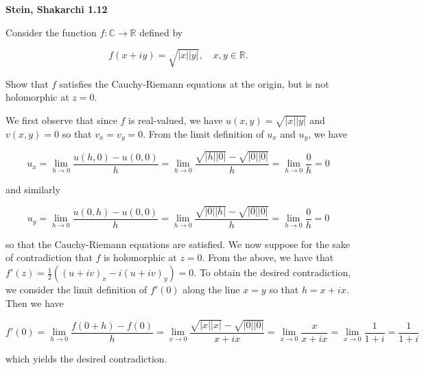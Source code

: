 \textbf{Stein, Shakarchi 1.12}

Consider the function $f: \mathbb{C} \to \mathbb{R}$ defined by

$$
f(x + iy) = \sqrt{|x||y|}, \quad x, y \in \mathbb{R}.
$$

Show that $f$ satisfies the Cauchy-Riemann equations at the origin, but is not holomorphic at $z = 0$.

\begin{solution}
    We first observe that since $f$ is real-valued, we have $u(x, y) = \sqrt{|x||y|}$ and $v(x, y) = 0$ so that 
    $v_x = v_y = 0$. From the limit definition of $u_x$ and $u_y$, we have

    $$
    u_x = \lim\limits_{h \to 0} \frac{u(h, 0) - u(0, 0)}{h} 
        = \lim\limits_{h \to 0} \frac{\sqrt{|h||0|} - \sqrt{|0||0|}}{h} 
        = \lim\limits_{h \to 0} \frac{0}{h} 
        = 0
    $$

    and similarly

    $$
    u_y = \lim\limits_{h \to 0} \frac{u(0, h) - u(0, 0)}{h} 
        = \lim\limits_{h \to 0} \frac{\sqrt{|0||h|} - \sqrt{|0||0|}}{h} 
        = \lim\limits_{h \to 0} \frac{0}{h} 
        = 0
    $$

    so that the Cauchy-Riemann equations are satisfied. We now suppose for the sake of contradiction that $f$ is 
    holomorphic at $z = 0$. From the above, we have that $f'(z) = \frac{1}{2}\left((u + iv)_x - i (u + iv)_y\right) = 0$. To obtain
    the desired contradiction, we consider the limit definition of $f'(0)$ along the line $x = y$ so that $h = x + ix$.
    Then we have 

    $$
    f'(0) = \lim\limits_{h \to 0} \frac{f(0 + h) - f(0)}{h} 
          = \lim\limits_{x \to 0} \frac{\sqrt{|x||x|} - \sqrt{|0||0|}}{x + ix} 
        = \lim\limits_{x \to 0} \frac{x}{x + ix} 
        = \lim\limits_{x \to 0} \frac{1}{1 + i}
        = \frac{1}{1 + i}
    $$

    which yields the desired contradiction.
    \ \\
\end{solution}
